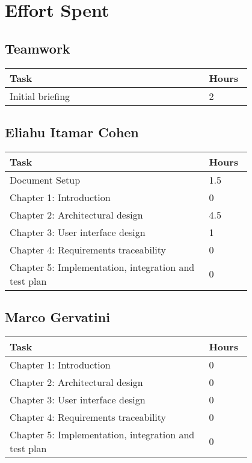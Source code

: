 \chapter{Effort Spent}
\section{Teamwork}
\begin{center}
    \begin{tabular}{@{}p{0.7\linewidth} p{0.1\linewidth}@{}}
        \hline
        \textbf{Task} & \textbf{Hours} \\ \hline
        Initial briefing & 2 \\ \hline
    \end{tabular}
\end{center}

\section{Eliahu Itamar Cohen}
\begin{center}
    \begin{tabular}{@{}p{0.7\linewidth} p{0.1\linewidth}@{}}
        \hline
        \textbf{Task} & \textbf{Hours} \\ \hline
        Document Setup & 1.5 \\ \hline
        Chapter 1: Introduction & 0 \\ \hline
        Chapter 2: Architectural design & 4.5 \\ \hline
        Chapter 3: User interface design & 1 \\ \hline
        Chapter 4: Requirements traceability & 0 \\ \hline
        Chapter 5: Implementation, integration and test plan & 0 \\ \hline
     
    \end{tabular}
\end{center}

\section{Marco Gervatini}
\begin{center}
	\begin{tabular}{@{}p{0.7\linewidth} p{0.1\linewidth}@{}}
		\hline
		\textbf{Task} & \textbf{Hours} \\ \hline
             Chapter 1: Introduction & 0 \\ \hline
             Chapter 2: Architectural design & 0 \\ \hline
             Chapter 3: User interface design & 0 \\ \hline
             Chapter 4: Requirements traceability & 0 \\ \hline
             Chapter 5: Implementation, integration and test plan & 0 \\ \hline
	\end{tabular}
\end{center}


